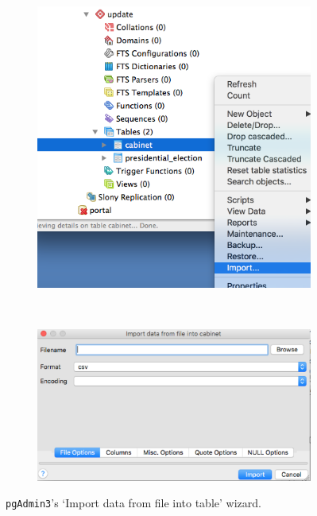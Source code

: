 \begin{figure}[ht!]
\centering
  \begin{subfigure}{.45\textwidth}
  \includegraphics[width=\textwidth,trim= 0 0 0 0, clip]{pcdb_documentation_screenshots/pgadmin3_import_data_to_table.png}
    \label{fig_pgadmin3_import_data_to_table}
  \end{subfigure}
  ~%
  \begin{subfigure}{.45\textwidth}
  \includegraphics[width=\textwidth,trim= 0 0 0 0, clip]{pcdb_documentation_screenshots/pgadmin3_import_data_wizard.png}
    \label{fig_pgadmin3_import_data_wizard}
  \end{subfigure} 
  \caption{\texttt{pgAdmin3}'s `Import data from file into table' wizard.}
\end{figure}


